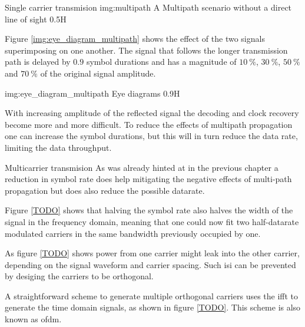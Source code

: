 \begin{subchapter}{Single carrier transmision}
               {img:multipath}
               {A Multipath scenario without a direct line of sight}
               {0.5}{H}

  Figure \ref{img:eye_diagram_multipath} shows the effect of the
  two signals superimposing on one another.
  The signal that follows the longer transmission path
  is delayed by $0.9$ symbol durations and has a magnitude
  of $\SI{10}{\percent}$, $\SI{30}{\percent}$, $\SI{50}{\percent}$ and
  $\SI{70}{\percent}$ of the original signal amplitude.

               {img:eye_diagram_multipath}
               {Eye diagrams}
               {0.9}{H}

  With increasing amplitude of the reflected signal the decoding
  and clock recovery become more and more difficult.
  To reduce the effects of multipath propagation one can
  increase the symbol durations, but this will in turn
  reduce the data rate, limiting the data throughput.
\end{subchapter}

\begin{subchapter}{Multicarrier transmision}
  As was already hinted at in the previous chapter a reduction
  in symbol rate does help mitigating the negative effects of
  multi-path propagation but does also reduce the possible datarate.

  Figure \ref{TODO} shows that halving the symbol rate also
  halves the width of the signal in the frequency domain,
  meaning that one could now fit two half-datarate modulated carriers in the
  same bandwidth previously occupied by one.

  As figure \ref{TODO} shows power from one carrier might leak
  into the other carrier, depending on the signal waveform and
  carrier spacing. Such \gls{isi} can be prevented by desiging
  the carriers to be orthogonal.

  A straightforward scheme to generate multiple orthogonal
  carriers uses the \gls{ifft} to generate the time domain
  signals, as shown in figure \ref{TODO}.
  This scheme is also known as \acrlong{ofdm}.

\end{subchapter}
